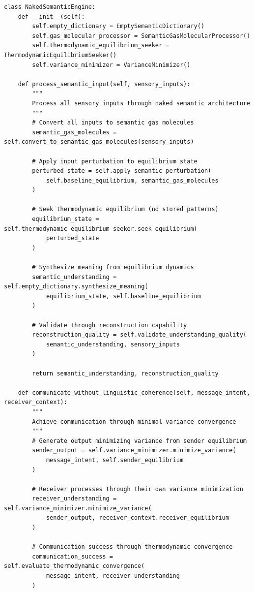 \documentclass[11pt,a4paper]{article}
\begin{document}
\begin{lstlisting}[caption=Naked Semantic Engine Implementation]
class NakedSemanticEngine:
    def __init__(self):
        self.empty_dictionary = EmptySemanticDictionary()
        self.gas_molecular_processor = SemanticGasMolecularProcessor()
        self.thermodynamic_equilibrium_seeker = ThermodynamicEquilibriumSeeker()
        self.variance_minimizer = VarianceMinimizer()
        
    def process_semantic_input(self, sensory_inputs):
        """
        Process all sensory inputs through naked semantic architecture
        """
        # Convert all inputs to semantic gas molecules
        semantic_gas_molecules = self.convert_to_semantic_gas_molecules(sensory_inputs)
        
        # Apply input perturbation to equilibrium state
        perturbed_state = self.apply_semantic_perturbation(
            self.baseline_equilibrium, semantic_gas_molecules
        )
        
        # Seek thermodynamic equilibrium (no stored patterns)
        equilibrium_state = self.thermodynamic_equilibrium_seeker.seek_equilibrium(
            perturbed_state
        )
        
        # Synthesize meaning from equilibrium dynamics
        semantic_understanding = self.empty_dictionary.synthesize_meaning(
            equilibrium_state, self.baseline_equilibrium
        )
        
        # Validate through reconstruction capability
        reconstruction_quality = self.validate_understanding_quality(
            semantic_understanding, sensory_inputs
        )
        
        return semantic_understanding, reconstruction_quality
    
    def communicate_without_linguistic_coherence(self, message_intent, receiver_context):
        """
        Achieve communication through minimal variance convergence
        """
        # Generate output minimizing variance from sender equilibrium
        sender_output = self.variance_minimizer.minimize_variance(
            message_intent, self.sender_equilibrium
        )
        
        # Receiver processes through their own variance minimization
        receiver_understanding = self.variance_minimizer.minimize_variance(
            sender_output, receiver_context.receiver_equilibrium
        )
        
        # Communication success through thermodynamic convergence
        communication_success = self.evaluate_thermodynamic_convergence(
            message_intent, receiver_understanding
        )
        

\end{lstlisting}
\end{document}
